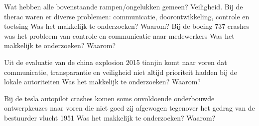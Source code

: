 \begin{thebibliography}{99}
{{{{{{%


Wat hebben alle bovenstaande rampen/ongelukken gemeen? Veiligheid.
Bij de therac waren er diverse problemen: communicatie, doorontwikkeling, controle en toetsing
Was het makkelijk te onderzoeken? Waarom?
Bij de boeing 737 crashes was het probleem van controle en communicatie naar medewerkers
Was het makkelijk te onderzoeken? Waarom?

Uit de evaluatie van de china explosion 2015 tianjin komt naar voren dat communicatie, transparantie en veiligheid niet altijd prioriteit hadden bij de lokale autoriteiten
Was het makkelijk te onderzoeken? Waarom?

Bij de tesla autopilot crashes komen soms onvoldoende onderbouwde ontwerpkeuzes naar voren die niet goed zij  afgewogen tegenover het gedrag van de bestuurder
vlucht 1951
Was het makkelijk te onderzoeken? Waarom?

}}}}}}
\end{thebibliography}
